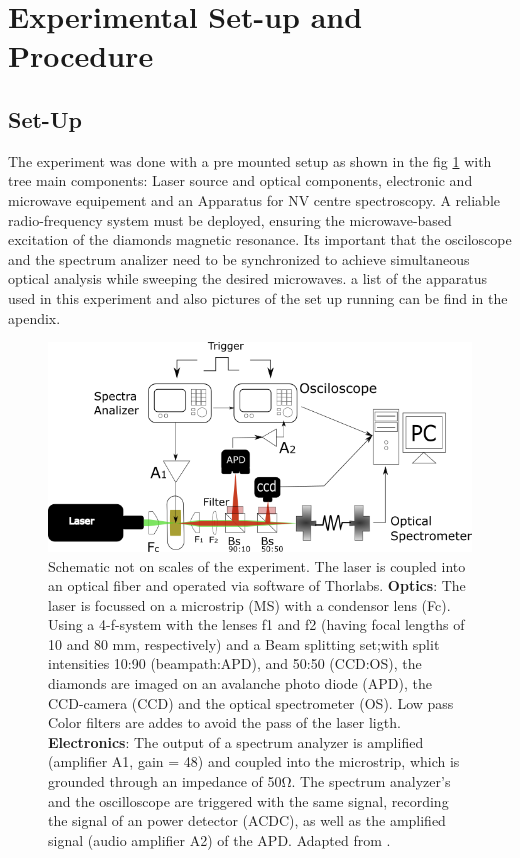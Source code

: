 \section{Experimental Set-up and Procedure}
\subsection{Set-Up}
The experiment was done with a pre mounted setup as shown in the fig \ref{fig:setup1} with tree main components: Laser source and optical components, electronic and microwave equipement and an Apparatus for NV centre spectroscopy. A reliable radio-frequency system must be deployed, ensuring the microwave-based excitation of the diamonds magnetic resonance. Its important that the osciloscope and the spectrum analizer need to be synchronized to achieve simultaneous optical analysis while sweeping the desired microwaves. a list of the apparatus used in this experiment and also pictures of the set up running can be find in the apendix.
\begin{figure}
	\centering
	\includegraphics[width=0.7\linewidth]{../figures/setup1}
	\caption[setup]{Schematic not on scales of the experiment. The laser is coupled into an optical ﬁber and operated via software of Thorlabs. \textbf{Optics}: The laser is focussed on a microstrip (MS) with a condensor lens (Fc). Using a 4-f-system with the lenses f1 and f2 (having focal lengths of 10 and 80 mm, respectively) and a Beam splitting set;with split intensities 10:90 (beampath:APD), and 50:50 (CCD:OS), the diamonds are imaged on an avalanche photo diode (APD), the CCD-camera (CCD) and the optical spectrometer (OS). Low pass Color ﬁlters are addes to avoid the pass of the laser ligth.
	\textbf{Electronics}: The output of a spectrum analyzer is ampliﬁed (ampliﬁer A1, gain = 48) and coupled into the microstrip, which is grounded through an impedance of 50Ω.
	The spectrum analyzer’s and the oscilloscope are triggered with the same signal, recording the signal of an power detector (ACDC), as well as the ampliﬁed signal (audio ampliﬁer A2) of the APD.  Adapted from \cite{anleitung}.}
	\label{fig:setup1}
\end{figure}
